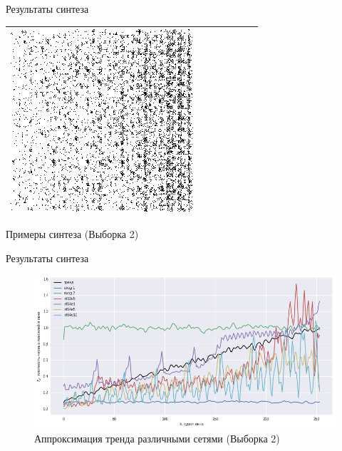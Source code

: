 \documentclass[12pt]{beamer}
\begin{document}
\begin{frame}{Результаты синтеза}
\begin{table}
\begin{center}
\begin{tabular}{p{1.2cm} p{1.2cm} p{1.2cm} p{1.2cm} p{1.2cm} p{1.2cm} p{1.2cm}}
					\includegraphics[width=1\linewidth]{8-results/sand-trend8/nf64e10/gen3}
					\\
					\hline
				\end{tabular}
				\vfill
				Примеры синтеза (Выборка 2)
			\end{center}
		\end{table}
	\end{frame}
	
	\begin{frame}{Результаты синтеза}
			\begin{figure}
				\includegraphics[width=\linewidth]{8-results/sand-trend8/results_cr}
				\vfill
				Аппроксимация тренда различными сетями (Выборка 2)
			\end{figure}
	\end{frame}
	
\end{document}

